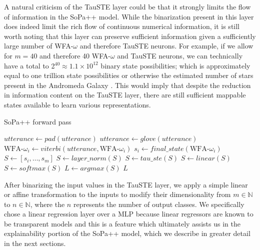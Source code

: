 A natural criticism of the TauSTE layer could be that it strongly limits the
flow of information in the SoPa++ model. While the binarization present in this
layer does indeed limit the rich flow of continuous numerical information, it is
still worth noting that this layer can preserve sufficient information given a
sufficiently large number of WFA-$\omega$ and therefore TauSTE neurons. For
example, if we allow for $m=40$ and therefore 40 WFA-$\omega$ and TauSTE
neurons, we can technically have a total to 2$^{40}\approx1.1\times10^{12}$
binary state possibilities; which is approximately equal to one trillion state
possibilities or otherwise the estimated number of stars present in the
Andromeda Galaxy \citep{10.1093/mnras/stu879}. This would imply that despite the
reduction in information content on the TauSTE layer, there are still sufficient
mappable states available to learn various representations.

\begin{algorithm}[t!]
  \small
  \caption{SoPa++ forward pass}
  \label{algo:spp_forward}
  \begin{algorithmic}[1]
    \Statex
    \Begin
    \State $utterance \gets pad(utterance)$ 
    \State $utterance \gets glove(utterance)$ 
    \State $\text{WFA-}\omega_i \gets viterbi(utterance, \text{WFA-}\omega_i)$
    \State $s_i \gets final\_state(\text{WFA-}\omega_i)$ 
    \EndFor
    \State $S \gets [s_i,\ldots,s_m]$ 
    \State $S \gets layer\_norm(S)$ 
    \State $S \gets tau\_ste(S)$  
    \State $S \gets linear(S)$ 
    \State $S \gets softmax(S)$ 
    \State $L \gets argmax(S)$ 
    \State \Return $L$
    \End
  \end{algorithmic}
\end{algorithm}

After binarizing the input values in the TauSTE layer, we apply a simple linear
or affine transformation to the inputs to modify their dimensionality from $m
\in \mathbb{N}$ to $n \in \mathbb{N}$, where the $n$ represents the number of
output classes. We specifically chose a linear regression layer over a MLP
because linear regressors are known to be transparent models
\citep{arrieta2020explainable} and this is a feature which ultimately assists us
in the explainability portion of the SoPa++ model, which we describe in greater
detail in the next sections.

